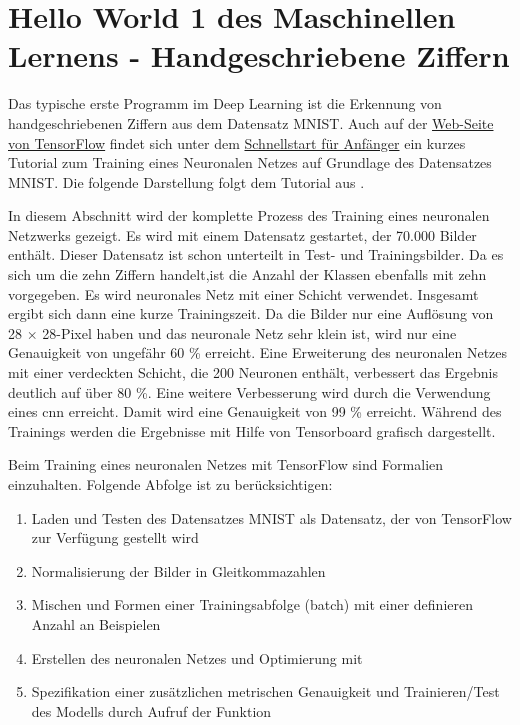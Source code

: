 \section{\glqq Hello World 1\grqq{}  des Maschinellen Lernens - Handgeschriebene Ziffern}

Das typische erste Programm im Deep Learning ist die Erkennung von handgeschriebenen Ziffern aus dem Datensatz MNIST. Auch auf der \href{https://www.tensorflow.org/}{Web-Seite von TensorFlow} findet sich unter dem 
\href{https://www.tensorflow.org/tutorials/quickstart/beginner}{Schnellstart für Anfänger} 
ein kurzes Tutorial zum Training eines Neuronalen Netzes auf Grundlage des Datensatzes MNIST. 
Die folgende Darstellung folgt dem Tutorial aus \cite{Heise:2020}.

\bigskip
 
In diesem Abschnitt wird der komplette Prozess des Training eines neuronalen Netzwerks gezeigt. Es wird mit einem Datensatz gestartet, der 70.000 Bilder enthält. Dieser Datensatz ist schon unterteilt in Test- und Trainingsbilder. Da es sich um die zehn Ziffern handelt,ist die Anzahl der Klassen ebenfalls mit zehn vorgegeben. Es wird neuronales Netz mit einer Schicht verwendet. Insgesamt ergibt sich dann eine kurze Trainingszeit. Da die Bilder nur eine Auflösung von 28 $\times$ 28-Pixel haben und das neuronale Netz sehr klein ist, wird nur eine Genauigkeit von ungefähr 60 \% erreicht. Eine Erweiterung des neuronalen Netzes mit einer verdeckten Schicht, die 200 Neuronen enthält, verbessert das Ergebnis deutlich auf über 80 \%.  Eine weitere Verbesserung wird durch die Verwendung eines \ac{cnn} erreicht. Damit wird eine Genauigkeit von 99 \% erreicht. Während des Trainings werden die Ergebnisse mit Hilfe von Tensorboard grafisch dargestellt.

\bigskip

Beim Training eines neuronalen Netzes mit TensorFlow sind Formalien einzuhalten. Folgende Abfolge ist zu berücksichtigen:



\begin{enumerate}
  \item Laden und Testen des Datensatzes MNIST als Datensatz, der von TensorFlow zur Verfügung gestellt wird
  \item Normalisierung der Bilder in Gleitkommazahlen
  \item Mischen und Formen einer Trainingsabfolge (batch) mit einer definieren Anzahl an Beispielen
  \item Erstellen des neuronalen Netzes und Optimierung mit 
  \item Spezifikation einer zusätzlichen metrischen Genauigkeit und 
        Trainieren/Test des Modells durch Aufruf der Funktion 
\end{enumerate}


